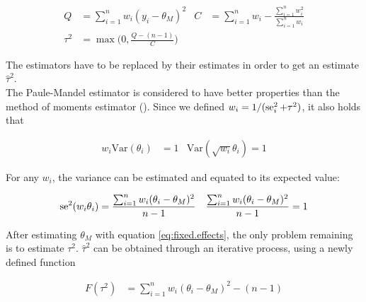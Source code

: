 \documentclass[11pt,a4paper,twoside]{book}\usepackage[]{graphicx}\usepackage[]{color}
\begin{document}
\begin{align}
Q &= \sum_{i = 1}^n w_i(y_i - \theta_M)^2 & C &= \sum_{i = 1}^n w_i - \frac{\sum_{i = 1}^n w_i^2}{\sum_{i = 1}^n w_i} \label{eq:Q.heterogeneity} \\
\tau^2 &= \max\big(0, \frac{Q - (n-1)}{C}\big) \label{eq:Tau.definition}
\end{align}

The estimators have to be replaced by their estimates in order to get an estimate $\hat{\tau}^2$.\\
The Paule-Mandel estimator \citep{paulemandel} is considered to have better properties than the method of moments estimator (\eg \citealp{tau.estimator.evaluation}). Since we defined $w_i = 1/(\operatorname{se}_i^2 + \tau^2)$, it also holds that

\begin{align}
w_i \textrm{Var}(\theta_i) &= 1 & \textrm{Var}(\sqrt{w_i}\theta_i) = 1 \nonumber
\end{align}

For any $w_i$, the variance can be estimated and equated to its expected value:

\begin{align}
\operatorname{se}^2(w_i\theta_i) &= \frac{\sum_{i = 1}^n w_i(\theta_i - \theta_M)^2}{n-1} & \frac{\sum_{i = 1}^n w_i(\theta_i - \theta_M)^2}{n-1} = 1 \label{eq:paulemandel}
\end{align}

After estimating $\theta_M$ with equation \eqref{eq:fixed.effects}, the only problem remaining is to estimate $\tau^2$. $\hat{\tau}^2$ can be obtained through an iterative process, using a newly defined function

\begin{align}
F(\tau^2) &= \sum_{i = 1}^n w_i(\theta_i - \theta_M)^2 - (n-1) \nonumber
\end{align}
\end{document}
